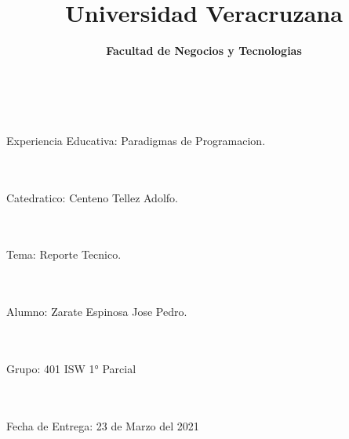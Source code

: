 \documentclass[40pt]{article}
\title{\textbf{Universidad Veracruzana} }
\date{\textbf{Facultad de Negocios y Tecnologias} }
\begin{document}
\maketitle
\textsf{\Large 
\\
\\
Experiencia Educativa: Paradigmas de Programacion. \\}
\\
\\ 
\maketitle
\textsf{\Large Catedratico: Centeno Tellez Adolfo. \\}
\\
\\
\maketitle
\textsf{\Large Tema: Reporte Tecnico. \\}
\\
\\
\maketitle
\textsf{\Large Alumno: Zarate Espinosa Jose Pedro. \\}
\\
\\ 
\maketitle
\textsf{\Large Grupo: 401 ISW 1° Parcial \\}
\\
\\
\maketitle
\textsf{\Large Fecha de Entrega: 23 de Marzo del 2021 \\}
\end{document}
